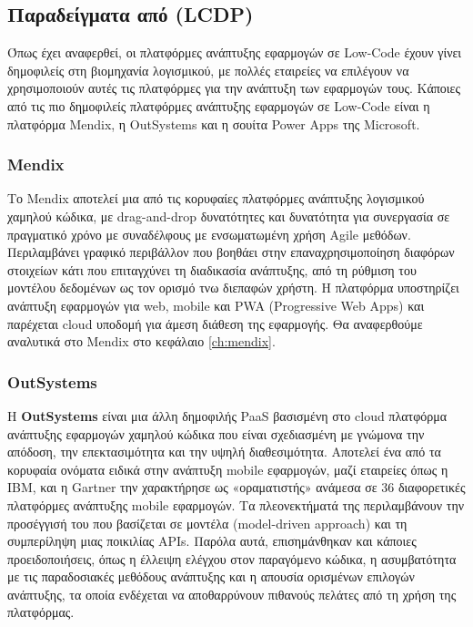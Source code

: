         \subsection{Παραδείγματα από (LCDP)}
            Όπως έχει αναφερθεί, οι πλατφόρμες ανάπτυξης εφαρμογών σε Low-Code έχουν γίνει δημοφιλείς στη βιομηχανία λογισμικού, με πολλές εταιρείες να επιλέγουν να χρησιμοποιούν αυτές τις πλατφόρμες για την ανάπτυξη των εφαρμογών τους. Κάποιες από τις πιο δημοφιλείς πλατφόρμες ανάπτυξης εφαρμογών σε Low-Code είναι η πλατφόρμα Mendix, η OutSystems και η σουίτα Power Apps της Microsoft.

            \subsubsection{Mendix}
            Το Mendix αποτελεί μια από τις κορυφαίες πλατφόρμες ανάπτυξης λογισμικού χαμηλού κώδικα, με drag-and-drop δυνατότητες και δυνατότητα για συνεργασία σε πραγματικό χρόνο με συναδέλφους με ενσωματωμένη χρήση Agile μεθόδων. Περιλαμβάνει γραφικό περιβάλλον που βοηθάει στην επαναχρησιμοποίηση διαφόρων στοιχείων κάτι που επιταγχύνει τη διαδικασία ανάπτυξης, από τη ρύθμιση του μοντέλου δεδομένων ως τον ορισμό τνω διεπαφών χρήστη. Η πλατφόρμα υποστηρίζει ανάπτυξη εφαρμογών για web, mobile και PWA (Progressive Web Apps) και παρέχεται cloud υποδομή για άμεση διάθεση της εφαρμογής. Θα αναφερθούμε αναλυτικά στο Mendix στο κεφάλαιο \ref{ch:mendix}.

            \subsubsection{OutSystems}
            Η \textbf{OutSystems} είναι μια άλλη δημοφιλής PaaS βασισμένη στο cloud πλατφόρμα ανάπτυξης εφαρμογών χαμηλού κώδικα που είναι σχεδιασμένη με γνώμονα την απόδοση, την επεκτασιμότητα και την υψηλή διαθεσιμότητα. Αποτελεί ένα από τα κορυφαία ονόματα ειδικά στην ανάπτυξη mobile εφαρμογών, μαζί εταιρείες όπως η IBM, και η Gartner την χαρακτήρησε ως «οραματιστής» ανάμεσα σε 36 διαφορετικές πλατφόρμες ανάπτυξης mobile εφαρμογών. Τα πλεονεκτήματά της περιλαμβάνουν την προσέγγισή του που βασίζεται σε μοντέλα (model-driven approach) και τη συμπερίληψη μιας ποικιλίας APIs. Παρόλα αυτά, επισημάνθηκαν και κάποιες προειδοποιήσεις, όπως η έλλειψη ελέγχου στον παραγόμενο κώδικα, η ασυμβατότητα με τις παραδοσιακές μεθόδους ανάπτυξης και η απουσία ορισμένων επιλογών ανάπτυξης, τα οποία ενδέχεται να αποθαρρύνουν πιθανούς πελάτες από τη χρήση της πλατφόρμας. \cite{QuadrantOutSystems}


